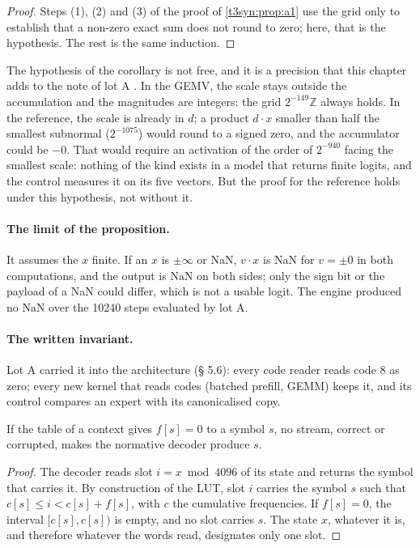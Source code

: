 \begin{proof}
Steps (1), (2) and (3) of the proof of \cref{t3syn:prop:a1} use the grid only to establish that a non-zero exact sum does not round to zero; here, that is the hypothesis. The rest is the same induction.
\end{proof}

The hypothesis of the corollary is not free, and it is a precision that this chapter adds to the note of lot A \calc. In the GEMV, the scale stays outside the accumulation and the magnitudes are integers: the grid $2^{-149}\mathbb{Z}$ always holds. In the reference, the scale is already in $d$; a product $d\cdot x$ smaller than half the smallest subnormal ($2^{-1075}$) would round to a signed zero, and the accumulator could be $-0$. That would require an activation of the order of $2^{-940}$ facing the smallest scale: nothing of the kind exists in a model that returns finite logits, and the control measures it on its five vectors. But the proof for the reference holds under this hypothesis, not without it.

\paragraph{The limit of the proposition.} It assumes the $x$ finite. If an $x$ is $\pm\infty$ or NaN, $v \cdot x$ is NaN for $v = \pm 0$ in both computations, and the output is NaN on both sides; only the sign bit or the payload of a NaN could differ, which is not a usable logit. The engine produced no NaN over the \num{10240} steps evaluated by lot A.

\paragraph{The written invariant.} Lot A carried it into the architecture (§ 5.6): every code reader reads code 8 as zero; every new kernel that reads codes (batched prefill, GEMM) keeps it, and its control compares an expert with its canonicalised copy.

\begin{lemme}\label{t3cod:lem:tables}
If the table of a context gives $f[s] = 0$ to a symbol $s$, no stream, correct or corrupted, makes the normative decoder produce $s$.
\end{lemme}

\begin{proof}
The decoder reads slot $i = x \bmod 4096$ of its state and returns the symbol that carries it. By construction of the LUT, slot $i$ carries the symbol $s$ such that $c[s] \le i < c[s] + f[s]$, with $c$ the cumulative frequencies. If $f[s] = 0$, the interval $[c[s], c[s])$ is empty, and no slot carries $s$. The state $x$, whatever it is, and therefore whatever the words read, designates only one slot.
\end{proof}


